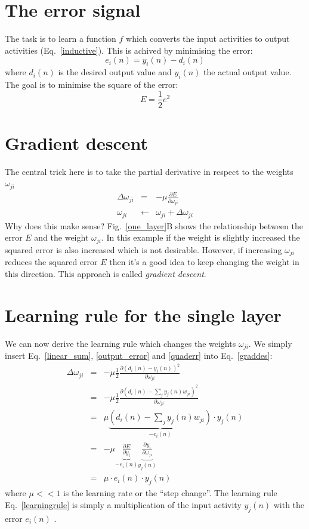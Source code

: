 \documentclass[12pt]{article}
\begin{document}
\section{The error signal}
The task is to learn a function $f$ which converts the input activities to output activities
(Eq.~\ref{inductive}).
This is achived by minimising the error:
\begin{equation}
  e_i(n) = y_i(n) - d_i(n) \label{output_error}
\end{equation}
where $d_i(n)$ is the desired output value and $y_i(n)$ the actual output value.
The goal is to minimise the square of the error:
\begin{equation}
  E = \frac{1}{2} e^2 \label{quaderr}
\end{equation}

\section{Gradient descent}
The central trick here is to take the partial derivative in respect to the weights $\omega_{ji}$
\begin{eqnarray}
  \Delta\omega_{ji} & = & - \mu \frac{\partial E}{\partial \omega_{ji}} \label{graddes} \\
  \omega_{ji} & \leftarrow & \omega_{ji} + \Delta\omega_{ji}
\end{eqnarray}
Why does this make sense? Fig.~\ref{one_layer}B shows the relationship
between the error $E$ and the weight $\omega_{ji}$. In this example if
the weight is slightly increased the squared error is also increased
which is not desirable.  However, if increasing $\omega_{ji}$ reduces
the squared error $E$ then it's a good idea to keep changing the
weight in this direction. This approach is called \textsl{gradient
  descent}.

\section{Learning rule for the single layer}
We can now derive the learning rule which changes the weights
$\omega_{ji}$.  We simply insert Eq.~\ref{linear_sum},
\ref{output_error} and \ref{quaderr} into Eq.~\ref{graddes}:
\begin{eqnarray}
  \Delta\omega_{ji}
   & = & - \mu \frac{1}{2} \frac{\partial ( d_i(n) - y_i(n) )^2 }{\partial \omega_{ji}} \\
   & = & - \mu \frac{1}{2} \frac{\partial \left( d_i(n) - \sum_j y_j(n) w_{ji} \right)^2 }{\partial \omega_{ji}} \\
  & = & \mu \underbrace{\left(d_i(n) - \sum_j y_j(n) w_{ji}\right)}_{-e_i(n)} \cdot y_j(n) \\
   & = & - \mu \underbrace{\frac{\partial E}{\partial y_i}}_{-e_i(n)} \underbrace{\frac{\partial y_i}{\partial \omega_{ji}}}_{y_j(n)} \label{chainrule}\\
  & = & \mu \cdot e_i(n) \cdot y_j(n) \label{learningrule}
\end{eqnarray}
where $\mu << 1$ is the learning rate or the ``step change''. The
learning rule Eq.~\ref{learningrule} is simply a multiplication of the
input activity $y_j(n)$ with the error $e_i(n)$ \citep{Widrow60}.
\end{document}
